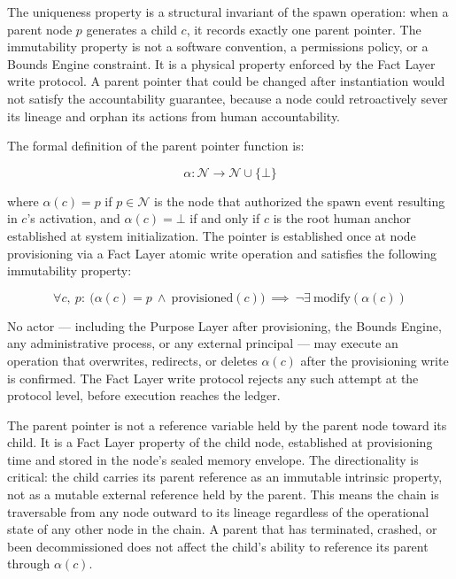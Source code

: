 The uniqueness property is a structural invariant of the spawn operation: when a parent node $p$ generates a child $c$, it records exactly one parent pointer. The immutability property is not a software convention, a permissions policy, or a Bounds Engine constraint. It is a physical property enforced by the Fact Layer write protocol. A parent pointer that could be changed after instantiation would not satisfy the accountability guarantee, because a node could retroactively sever its lineage and orphan its actions from human accountability.

The formal definition of the parent pointer function is:

\begin{equation}
\alpha : \mathcal{N} \rightarrow \mathcal{N} \cup \{\bot\}
\label{eq:alpha-function}
\end{equation}

where $\alpha(c) = p$ if $p \in \mathcal{N}$ is the node that authorized the spawn event resulting in $c$'s activation, and $\alpha(c) = \bot$ if and only if $c$ is the root human anchor established at system initialization. The pointer is established once at node provisioning via a Fact Layer atomic write operation and satisfies the following immutability property:

\begin{equation}
\forall c,\ p:\ \bigl(\alpha(c) = p \ \land \ \text{provisioned}(c)\bigr) \ \implies \ \neg\exists\ \text{modify}(\alpha(c))
\label{eq:parent-pointer-immutability}
\end{equation}

No actor — including the Purpose Layer after provisioning, the Bounds Engine, any administrative process, or any external principal — may execute an operation that overwrites, redirects, or deletes $\alpha(c)$ after the provisioning write is confirmed. The Fact Layer write protocol rejects any such attempt at the protocol level, before execution reaches the ledger.

The parent pointer is not a reference variable held by the parent node toward its child. It is a Fact Layer property of the child node, established at provisioning time and stored in the node's sealed memory envelope. The directionality is critical: the child carries its parent reference as an immutable intrinsic property, not as a mutable external reference held by the parent. This means the chain is traversable from any node outward to its lineage regardless of the operational state of any other node in the chain. A parent that has terminated, crashed, or been decommissioned does not affect the child's ability to reference its parent through $\alpha(c)$.

